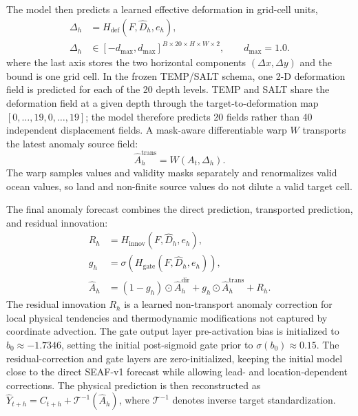 \documentclass[conference]{IEEEtran}
\begin{document}
The model then predicts a learned effective deformation in grid-cell units,
\begin{equation}
\begin{aligned}
\Delta_h&=H_{\mathrm{def}}(F,\widehat{D}_h,e_h),\\[-1pt]
\Delta_h&\in[-d_{\max},d_{\max}]^{B\times20\times H\times W\times2},
\qquad d_{\max}=1.0.
\end{aligned}
\label{eq:dynaseaf_deformation}
\end{equation}
where the last axis stores the two horizontal components $(\Delta x,\Delta y)$ and the bound is one grid cell. In the frozen TEMP/SALT schema, one 2-D deformation field is predicted for each of the 20 depth levels. TEMP and SALT share the deformation field at a given depth through the target-to-deformation map $[0,\ldots,19,0,\ldots,19]$; the model therefore predicts 20 fields rather than 40 independent displacement fields. A mask-aware differentiable warp $W$ transports the latest anomaly source field:
\begin{equation}
\widehat{A}^{\mathrm{trans}}_h
 =W(A_t,\Delta_h).
\label{eq:dynaseaf_transport}
\end{equation}
The warp samples values and validity masks separately and renormalizes valid ocean values, so land and non-finite source values do not dilute a valid target cell.

The final anomaly forecast combines the direct prediction, transported prediction, and residual innovation:
\begin{align}
R_h&=H_{\mathrm{innov}}(F,\widehat{D}_h,e_h),\nonumber\\
g_h&=\sigma\!\left(H_{\mathrm{gate}}(F,\widehat{D}_h,e_h)\right),\nonumber\\
\widehat{A}_h&=(1-g_h)\odot\widehat{A}^{\mathrm{dir}}_h
       +g_h\odot\widehat{A}^{\mathrm{trans}}_h+R_h.
\label{eq:dynaseaf_forecast}
\end{align}
The residual innovation $R_h$ is a learned non-transport anomaly correction for local physical tendencies and thermodynamic modifications not captured by coordinate advection. The gate output layer pre-activation bias is initialized to $b_0 \approx -1.7346$, setting the initial post-sigmoid gate prior to $\sigma(b_0) \approx 0.15$. The residual-correction and gate layers are zero-initialized, keeping the initial model close to the direct SEAF-v1 forecast while allowing lead- and location-dependent corrections. The physical prediction is then reconstructed as $\widehat{Y}_{t+h}=C_{t+h}+\mathcal{T}^{-1}(\widehat{A}_h)$, where $\mathcal{T}^{-1}$ denotes inverse target standardization.
\end{document}
